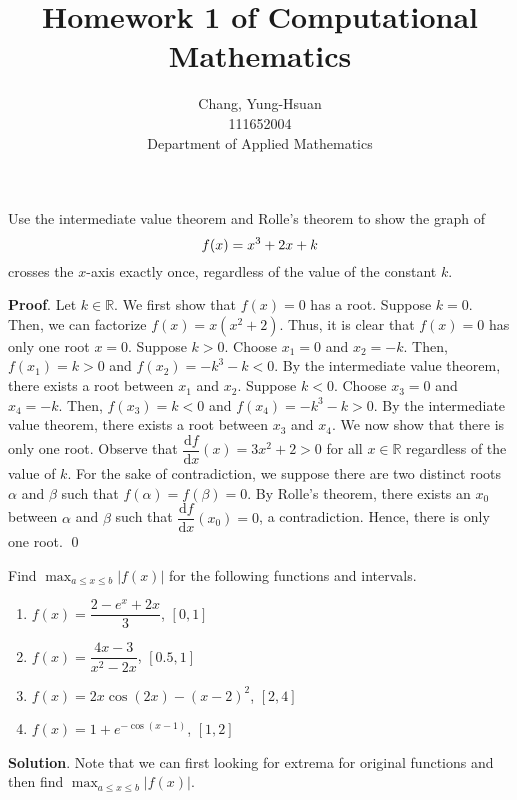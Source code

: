 \documentclass[11pt]{article}
\title{Homework 1 of Computational Mathematics}
\author{Chang, Yung-Hsuan\\111652004\\Department of Applied Mathematics}
\theoremstyle{break}
\newcommand{\dd}{\text{d}}
\numberwithin{equation}{theorem}
\begin{document}
\maketitle
\thispagestyle{empty}
\newpage
{}

\begin{problem}\label{problem 1}
    Use the intermediate value theorem and Rolle's theorem to show the graph of \vspace{-0.6em}
    \begin{equation*}
        f(x)=x^3+2x+k \vspace{-0.6em}
    \end{equation*}
    crosses the $x$-axis exactly once, regardless of the value of the constant $k$.
\end{problem}
\textbf{Proof}. Let $k\in\mathbb R$. We first show that $f(x)=0$ has a root. Suppose $k=0$. Then, we can factorize $f(x)=x(x^2+2)$. Thus, it is clear that $f(x)=0$ has only one root $x=0$. Suppose $k>0$. Choose $x_1=0$ and $x_2=-k$. Then, $f(x_1)=k>0$ and $f(x_2)=-k^3-k<0$. By the intermediate value theorem, there exists a root between $x_1$ and $x_2$. Suppose $k<0$. Choose $x_3=0$ and $x_4=-k$. Then, $f(x_3)=k<0$ and $f(x_4)=-k^3-k>0$. By the intermediate value theorem, there exists a root between $x_3$ and $x_4$. We now show that there is only one root. Observe that $\dfrac{\dd f}{\dd x}(x)=3x^2+2>0$ for all $x\in\mathbb R$ regardless of the value of $k$. For the sake of contradiction, we suppose there are two distinct roots $\alpha$ and $\beta$ such that $f(\alpha)=f(\beta)=0$. By Rolle's theorem, there exists an $x_0$ between $\alpha$ and $\beta$ such that $\dfrac{\dd f}{\dd x}(x_0)=0$, a contradiction. Hence, there is only one root. \qed
\newpage
\begin{problem}\label{problem 2}
    Find $\displaystyle\max_{a\leq x\leq b}|f(x)|$ for the following functions and intervals.
    \begin{enumerate}
        \item $f(x)=\dfrac{2-e^x+2x}{3}$, $[0, 1]$
        \item $f(x)=\dfrac{4x-3}{x^2-2x}$, $[0.5, 1]$
        \item $f(x)=2x\cos(2x)-(x-2)^2$, $[2, 4]$
        \item $f(x)=1+e^{-\cos(x-1)}$, $[1, 2]$
    \end{enumerate}
\end{problem}
\textbf{Solution}. Note that we can first looking for extrema for original functions and then find $\displaystyle\max_{a\leq x\leq b}|f(x)|$.
\end{document}
